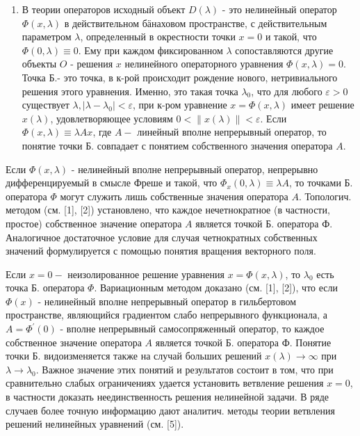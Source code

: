 \documentclass[10pt]{article}
\begin{document}
\begin{enumerate}

  \item В теории операторов исходный объект $D(\lambda)$ - это нелинейный оператор $\Phi(x, \lambda)$ в действительном бӓнаховом пространстве, с действительным параметром $\lambda$, определенный в окрестности точки $x=0$ и такой, что $\Phi(0, \lambda) \equiv 0$. Ему при каждом фиксированном $\lambda$ сопоставляются другие объекты $O$ - решения $x$ нелинейного операторного уравнения $\Phi(x, \lambda)=0$. Точка Б.- это точка, в к-рой происходит рождение нового, нетривиального решения этого уравнения. Именно, это такая точка $\lambda_{0}$, что для любого $\varepsilon>0$ существует $\lambda,\left|\lambda-\lambda_{0}\right|<\varepsilon$, при к-ром уравнение $x=\Phi(x, \lambda)$ имеет решение $x(\lambda)$, удовлетворяющее условиям $0<\|x(\lambda)\|<\varepsilon$. Если $\Phi(x, \lambda) \equiv \lambda A x$, где $A-$ линейный вполне непрерывный оператор, то понятие точки Б. совпадает с понятием собственного значения оператора $A$.

\end{enumerate}



Если $\Phi(x, \lambda)$ - нелинейный вполне непрерывный оператор, непрерывно дифференцируемый в смысле Фреше и такой, что $\Phi_{x}(0, \lambda) \equiv \lambda A$, то точками Б. оператора $\Phi$ могут служить лишь собственные значения оператора $A$. Топологич. методом (см. [1], [2]) установлено, что каждое нечетнократное (в частности, простое) собственное значение оператора $A$ является точкой Б. оператора $Ф$. Аналогичное достаточное условие для случая четнократных собственных значений формулируется с помощью понятия вращения векторного поля.



Если $x=0-$ неизолированное решение уравнения $x=\Phi(x, \lambda)$, то $\lambda_{0}$ есть точка Б. оператора $\Phi$. Вариационным методом доказано (см. [1], [2]), что если $\Phi(x)$ - нелинейный вполне непрерывный оператор в гильбертовом пространстве, являющийся градиентом слабо непрерывного функционала, а $A=\Phi^{\prime}(0)$ - вполне непрерывный самосопряженный оператор, то каждое собственное значение оператора $A$ является точкой Б. оператора Ф. Понятие точки Б. видоизменяется также на случай больших решений $x(\lambda) \rightarrow \infty$ при $\lambda \rightarrow \lambda_{0}$. Важное значение этих понятий и результатов состоит в том, что при сравнительно слабых ограничениях удается установить ветвление решения $x=0$, в частности доказать неединственность решения нелинейной задачи. В ряде случаев более точную информацию дают аналитич. методы теории ветвления решений нелинейных уравнений (см. [5]).
\end{document}

